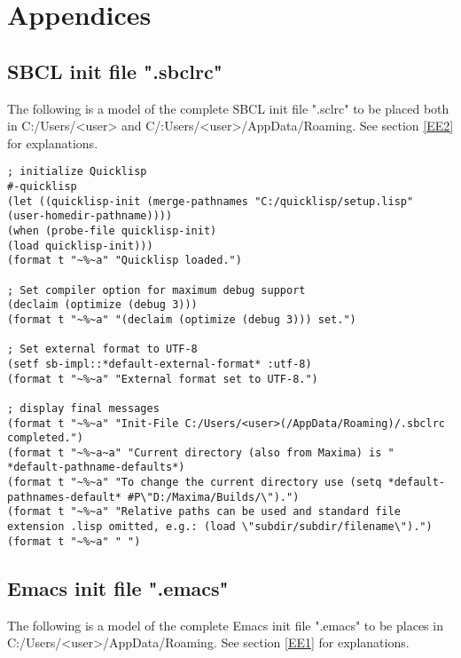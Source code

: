 \documentclass[../Maxima_Workbook.tex]{subfiles}
\begin{document}
\appendix	
\part{Appendices}
	
\chapter{SBCL init file ".sbclrc"}\label{AA2}

The following is a model of the complete SBCL init file ".sclrc" to be placed both in C:/Users/<user> and C/:Users/<user>/AppData/Roaming. See section \ref{EE2} for explanations.

\begin{lstlisting}[style=lisp]
; initialize Quicklisp
#-quicklisp
(let ((quicklisp-init (merge-pathnames "C:/quicklisp/setup.lisp" (user-homedir-pathname))))
(when (probe-file quicklisp-init)
(load quicklisp-init)))
(format t "~%~a" "Quicklisp loaded.")

; Set compiler option for maximum debug support
(declaim (optimize (debug 3)))
(format t "~%~a" "(declaim (optimize (debug 3))) set.")

; Set external format to UTF-8
(setf sb-impl::*default-external-format* :utf-8)
(format t "~%~a" "External format set to UTF-8.")

; display final messages
(format t "~%~a" "Init-File C:/Users/<user>(/AppData/Roaming)/.sbclrc completed.")
(format t "~%~a~a" "Current directory (also from Maxima) is " *default-pathname-defaults*)
(format t "~%~a" "To change the current directory use (setq *default-pathnames-default* #P\"D:/Maxima/Builds/\").")
(format t "~%~a" "Relative paths can be used and standard file extension .lisp omitted, e.g.: (load \"subdir/subdir/filename\").")
(format t "~%~a" " ")
\end{lstlisting}

\chapter{Emacs init file ".emacs"}\label{AA1}

The following is a model of the complete Emacs init file ".emacs" to be places in C:/Users/<user>/AppData/Roaming. See section \ref{EE1} for explanations.
\end{document}
